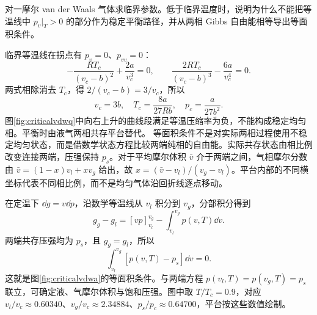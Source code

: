 \begin{example}[临界点与等面积条件]
对一摩尔 van der Waals 气体求临界参数。低于临界温度时，说明为什么不能把等温线中 $p_v|_T>0$ 的部分作为稳定平衡路径，并从两相 Gibbs 自由能相等导出等面积条件。
\end{example}
\begin{solution}
临界等温线在拐点有 $p_v=0$、$p_{vv}=0$：
\[
 -\frac{RT_c}{(v_c-b)^2}+\frac{2a}{v_c^3}=0,\qquad
 \frac{2RT_c}{(v_c-b)^3}-\frac{6a}{v_c^4}=0.
\]
两式相除消去 $T_c$，得 $2/(v_c-b)=3/v_c$，所以
\[
 v_c=3b,\quad T_c=\frac{8a}{27Rb},\quad p_c=\frac a{27b^2}.
\]
图\ref{fig:criticalvdwq}中向右上升的曲线段满足等温压缩率为负，不能构成稳定均匀相。平衡时由液气两相共存平台替代。
等面积条件不是对实际两相过程使用不稳定均匀状态，而是借数学状态方程比较两端纯相的自由能。实际共存状态由相比例改变连接两端，压强保持 $p_s$。对于平均摩尔体积 $\bar v$ 介于两端之间，气相摩尔分数由 $\bar v=(1-x)v_l+xv_g$ 给出，故 $x=(\bar v-v_l)/(v_g-v_l)$。平台内部的不同横坐标代表不同相比例，而不是均匀气体沿回折线逐点移动。

在定温下 $\dd g=v\dd p$，沿数学等温线从 $v_l$ 积分到 $v_g$，分部积分得到
\[
 g_g-g_l=[vp]_{v_l}^{v_g}-\int_{v_l}^{v_g}p(v,T)\dd v.
\]
两端共存压强均为 $p_s$，且 $g_g=g_l$，所以
\[
 \int_{v_l}^{v_g}[p(v,T)-p_s]\dd v=0.
\]
这就是图\ref{fig:criticalvdwa}的等面积条件。与两端方程 $p(v_l,T)=p(v_g,T)=p_s$ 联立，可确定液、气摩尔体积与饱和压强。图中取 $T/T_c=0.9$，对应 $v_l/v_c\approx0.60340$、$v_g/v_c\approx2.34884$、$p_s/p_c\approx0.64700$，平台按这些数值绘制。
\end{solution}

